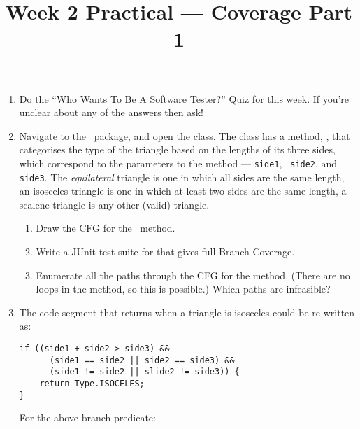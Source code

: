 



\title{Week 2 Practical --- Coverage Part 1}

\begin{enumerate}

    \item Do the ``Who Wants To Be A Software Tester?'' Quiz for this week.
    If you're unclear about any of the answers then ask!

    \item Navigate to the \lecturespackage~package, and open the
    \triangleclass class. The class has a method, \classifymethod, that
    categorises the type of the triangle based on the lengths of its three sides,
    which correspond to the parameters to the method --- {\tt side1}, {\tt
    side2}, and {\tt side3}. The {\it equilateral} triangle is one in which all sides
    are the same length, an isosceles triangle is one in which at least two
    sides are the same length, a scalene triangle is any other (valid) triangle. 

        \begin{enumerate}

            \item Draw the CFG for the \classifymethod~method.
            
            \item Write a JUnit test suite for \triangleclass that gives 
            full Branch Coverage. 
            
            \item Enumerate all the paths through the CFG for the method. (There
            are no loops in the method, so this is possible.) Which paths are
            infeasible?
            
        \end{enumerate}

    \item The code segment that returns when a triangle is isosceles could be re-written as:

        \verb$if ((side1 + side2 > side3) &&$\\ 
        \verb$      (side1 == side2 || side2 == side3) &&$\\
        \verb$      (side1 != side2 || slide2 != side3)) {$\\
        \verb$    return Type.ISOCELES;$\\
        \verb$}$

        For the above branch predicate:


\end{enumerate}
